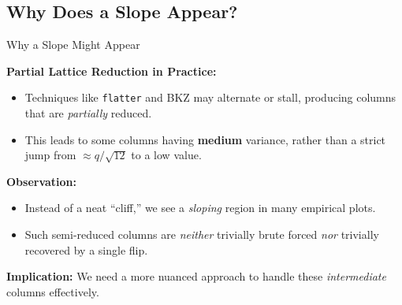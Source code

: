 \documentclass{beamer}
\begin{document}
\subsection*{Why Does a Slope Appear?}
\begin{frame}{Why a Slope Might Appear}

\textbf{Partial Lattice Reduction in Practice:}
\begin{itemize}
  \item Techniques like \texttt{flatter} and BKZ may alternate or stall, 
        producing columns that are \emph{partially} reduced.
  \item This leads to some columns having \textbf{medium} variance, 
        rather than a strict jump from $\approx q/\sqrt{12}$ to a low value.
\end{itemize}

\textbf{Observation:}
\begin{itemize}
  \item Instead of a neat ``cliff,'' we see a \emph{sloping} region
        in many empirical plots.
  \item Such semi-reduced columns are \emph{neither} trivially brute forced
        \emph{nor} trivially recovered by a single flip.
\end{itemize}

\bigskip
\textbf{Implication:} 
We need a more nuanced approach to handle these \emph{intermediate} columns effectively.
\end{frame}

\end{document}
